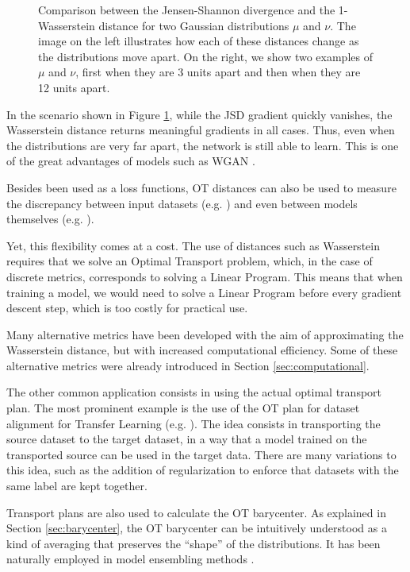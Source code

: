 \begin{figure}[H]
  \centering
  \def\svgscale{0.6}
  
  \caption{Comparison between the Jensen-Shannon divergence and the 1-Wasserstein distance for two Gaussian
  distributions $\mu$ and $\nu$. The image on the left illustrates how each of these distances change as the
  distributions move apart.
  On the right, we show two examples of $\mu$ and $\nu$, first when they are 3 units apart
  and then when they are 12 units apart.}
  \label{fig:wasserstein-jsd}
\end{figure}

In the scenario shown in Figure \ref{fig:wasserstein-jsd},
while the JSD gradient quickly vanishes, the Wasserstein distance returns meaningful gradients in all cases.
Thus, even when the distributions are very far apart, the network is still able to learn.
This is one of the great advantages of models such as WGAN \citep{arjovsky2017wasserstein}.

Besides been used as a loss functions, OT distances
can also be used to measure the discrepancy between input datasets (e.g. \citet{alvarez2020geometric})
and even between models themselves (e.g. \citet{li2020representation}).

Yet, this flexibility comes at a cost. The use of distances such as Wasserstein requires that we solve
an Optimal Transport problem, which, in the case of discrete metrics, corresponds to solving a Linear Program.
This means that when training a model,
we would need to solve a Linear Program before every gradient descent step,
which is too costly for practical use.

Many alternative metrics have been developed with the aim of approximating the Wasserstein
distance, but with increased computational efficiency.
Some of these alternative metrics were already introduced in Section \ref{sec:computational}.

The other common application consists in using the actual
optimal transport plan.
The most prominent example is the use of the OT plan for dataset alignment
for Transfer Learning (e.g. \citep{courty2014domain}). The idea consists in transporting the
source dataset to the target dataset, in a way that a model trained on the transported source can be used in
the target data. There are many variations to this idea, such as the addition of regularization to
enforce that datasets with the same label are kept together.

Transport plans are also used to calculate the OT barycenter. As explained in Section
\ref{sec:barycenter}, the OT barycenter can be intuitively understood as a kind of averaging that
preserves the ``shape'' of the distributions. It has been naturally employed in model ensembling methods
\citep{dognin2019wasserstein}.


